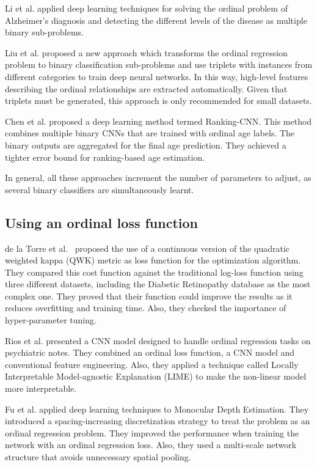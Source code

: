 \documentclass[journal]{IEEEtran}
\begin{document}
	Li et al. \cite{li2017deep} applied deep learning techniques for solving the ordinal problem of Alzheimer's diagnosis and detecting the different levels of the disease as multiple binary sub-problems.
	
	Liu et al. \cite{liu2017deep} proposed a new approach which transforms the ordinal regression problem to binary classification sub-problems and use triplets with instances from different categories to train deep neural networks. In this way, high-level features describing the ordinal relationships are extracted automatically. Given that triplets must be generated, this approach is only recommended for small datasets.
	
	Chen et al. \cite{chen2017using} proposed a deep learning method termed Ranking-CNN. This method combines multiple binary CNNs that are trained with ordinal age labels. The binary outputs are aggregated for the final age prediction. They achieved a tighter error bound for ranking-based age estimation.
	
	In general, all these approaches increment the number of parameters to adjust, as several binary classifiers are simultaneously learnt.
	
	
	\subsection{Using an ordinal loss function}
	
	de la Torre et al.~\cite{de2018weighted} proposed the use of a continuous version of the quadratic weighted kappa (QWK) metric as loss function for the optimization algorithm. They compared this cost function against the traditional log-loss function using three different datasets, including the Diabetic Retinopathy database as the most complex one. They proved that their function could improve the results as it reduces overfitting and training time. Also, they checked the importance of hyper-parameter tuning.
	
	Rios et al. \cite{rios2017ordinal} presented a CNN model designed to handle ordinal regression tasks on psychiatric notes. They combined an ordinal loss function, a CNN model and conventional feature engineering. Also, they applied a technique called Locally Interpretable Model-agnostic Explanation (LIME) to make the non-linear model more interpretable.
	
	Fu et al. \cite{fu2018deep} applied deep learning techniques to Monocular Depth Estimation. They introduced a spacing-increasing discretization strategy to treat the problem as an ordinal regression problem. They improved the performance when training the network with an ordinal regression loss. Also, they used a multi-scale network structure that avoids unnecessary spatial pooling.
	
\end{document}
